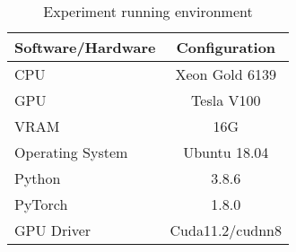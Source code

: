 

\begin{table}[htb]
    \caption{Experiment running environment}\label{tbl:ch2-exp-env}
    \centering
    \begin{tabular}{l c}
        \toprule
        Software/Hardware & Configuration   \\
        \midrule
        CPU               & Xeon Gold 6139  \\
        GPU               & Tesla V100      \\
        VRAM              & 16G             \\
        Operating System  & Ubuntu 18.04    \\
        Python            & 3.8.6           \\
        PyTorch           & 1.8.0           \\
        GPU Driver        & Cuda11.2/cudnn8 \\
        \bottomrule
    \end{tabular}
\end{table}



